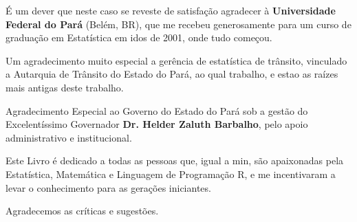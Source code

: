 \begin{refsection}

É um dever que neste caso se reveste de satisfação agradecer à \textbf{Universidade Federal do Pará} (Belém, BR), que me recebeu generosamente para um curso de graduação em Estatística em idos de 2001, onde tudo começou.
\vst


Um agradecimento muito especial a gerência de estatística de trânsito, vinculado a Autarquia de Trânsito do Estado do Pará, ao qual trabalho,  e estao as raízes mais antigas deste trabalho.
\vst

Agradecimento Especial ao Governo do Estado do Pará sob a gestão do Excelentíssimo Governador \textbf{Dr. Helder Zaluth Barbalho}, pelo apoio administrativo e institucional.
\vst




Este Livro é dedicado a todas as pessoas que, igual a min, são apaixonadas pela Estatística, Matemática e Linguagem de Programação R, e me incentivaram a levar o conhecimento para as gerações iniciantes.
\vst

Agradecemos as críticas e sugestões.


\printbibliography[heading=subbibliography]
\end{refsection}